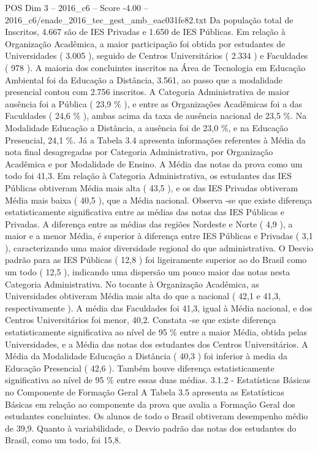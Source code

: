 \begin{textsample}{POS Dim 3 – 2016\_c6 – Score -4.00 – 2016\_c6/enade\_2016\_tec\_gest\_amb\_eac031fe82.txt}
Da população total de Inscritos, 4.667 são de IES Privadas e 1.650 de IES Públicas.
Em relação à Organização Acadêmica, a maior participação foi obtida por estudantes de Universidades ( 3.005 ), seguido de Centros Universitários ( 2.334 ) e Faculdades ( 978 ).
A maioria dos concluintes inscritos na Área de Tecnologia em Educação Ambiental foi da Educação a Distância, 3.561, ao passo que a modalidade presencial contou com 2.756 inscritos.
A Categoria Administrativa de maior ausência foi a Pública ( 23,9 \% ), e entre as Organizações Acadêmicas foi a das Faculdades ( 24,6 \% ), ambas acima da taxa de ausência nacional de 23,5 \%.
Na Modalidade Educação a Distância, a ausência foi de 23,0 \%, e na Educação Presencial, 24,1 \%.
Já a Tabela 3.4 apresenta informações referentes à Média da nota final desagregadas por Categoria Administrativa, por Organização Acadêmica e por Modalidade de Ensino.
A Média das notas da prova como um todo foi 41,3.
Em relação à Categoria Administrativa, os estudantes das IES Públicas obtiveram Média mais alta ( 43,5 ), e os das IES Privadas obtiveram Média mais baixa ( 40,5 ), que a Média nacional.
Observa -se que existe diferença estatisticamente significativa entre as médias das notas das IES Públicas e Privadas.
A diferença entre as médias das regiões Nordeste e Norte ( 4,9 ), a maior e a menor Média, é superior à diferença entre IES Públicas e Privadas ( 3,1 ), caracterizando uma maior diversidade regional do que administrativa.
O Desvio padrão para as IES Públicas ( 12,8 ) foi ligeiramente superior ao do Brasil como um todo ( 12,5 ), indicando uma dispersão um pouco maior das notas nesta Categoria Administrativa.
No tocante à Organização Acadêmica, as Universidades obtiveram Média mais alta do que a nacional ( 42,1 e 41,3, respectivamente ).
A média das Faculdades foi 41,3, igual à Média nacional, e dos Centros Universitários foi menor, 40,2.
Constata -se que existe diferença estatisticamente significativa ao nível de 95 \% entre a maior Média, obtida pelas Universidades, e a Média das notas dos estudantes dos Centros Universitários.
A Média da Modalidade Educação a Distância ( 40,3 ) foi inferior à media da Educação Presencial ( 42,6 ).
Também houve diferença estatisticamente significativa ao nível de 95 \% entre essas duas médias. 3.1.2 - Estatísticas Básicas no Componente de Formação Geral A Tabela 3.5 apresenta as Estatísticas Básicas em relação ao componente da prova que avalia a Formação Geral dos estudantes concluintes.
Os alunos de todo o Brasil obtiveram desempenho médio de 39,9.
Quanto à variabilidade, o Desvio padrão das notas dos estudantes do Brasil, como um todo, foi 15,8.

\end{textsample}
